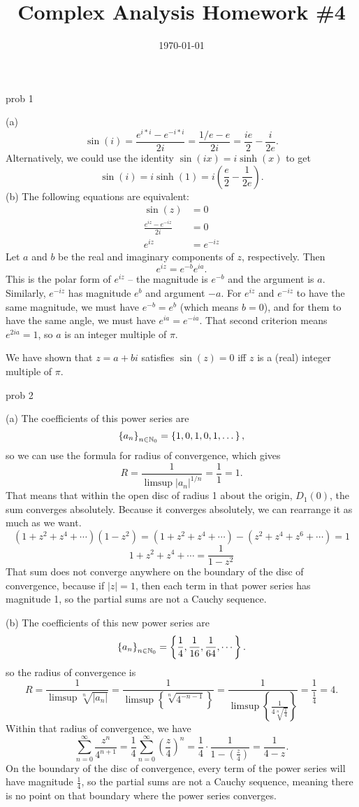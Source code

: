 \documentclass{article}
\date{\today}
\title{Complex Analysis Homework \#4}
\begin{document}
\maketitle

\begin{prob}
    prob 1
\end{prob}
(a)
\[ \sin(i) = \frac{e^{i*i}-e^{-i*i}}{2i} = \frac{1/e-e}{2i} = \frac{ie}{2}- \frac{i}{2e}. \]
Alternatively, we could use the identity $\sin(ix)=i \sinh(x)$ to get
\[ \sin(i) = i \sinh(1) = i \left( \frac{e}{2} - \frac{1}{2e} \right).  \]
(b) The following equations are equivalent:
\begin{align*}
    \sin(z) &= 0 \\
    \frac{e^{iz}-e^{-iz}}{2i} &= 0 \\
    e^{iz} &= e^{-iz}
\end{align*}
Let $a$ and $b$ be the real and imaginary components of $z$, respectively. Then
\[ e^{iz}=e^{-b}e^{ia}. \]
This is the polar form of $e^{iz}$ -- the magnitude is $e^{-b}$ and the argument is $a$. Similarly, $e^{-iz}$ has magnitude $e^b$ and argument $-a$. For $e^{iz}$ and $e^{-iz}$ to have the same magnitude, we must have $e^{-b}=e^b$ (which means $b=0$), and for them to have the same angle, we must have $e^{ia}=e^{-ia}$. That second criterion means $e^{2ia}=1$, so $a$ is an integer multiple of $\pi$.
\par
We have shown that $z=a+bi$ satisfies $\sin(z)=0$ iff $z$ is a (real) integer multiple of $\pi$.

\begin{prob}
    prob 2
\end{prob}
(a) The coefficients of this power series are
\[ \left\{ a_n \right\}_{n \in \mathbb{N}_0} = \left\{ 1,0,1,0,1,\dots \right\}, \]
so we can use the formula for radius of convergence, which gives
\[ R = \frac{1}{\limsup |a_n|^{1/n}} = \frac{1}{1} = 1. \]
That means that within the open disc of radius 1 about the origin, $D_1(0)$, the sum converges absolutely. Because it converges absolutely, we can rearrange it as much as we want.
\[ (1+z^2+z^4+\cdots)(1-z^2)=(1+z^2+z^4+\cdots)-(z^2+z^4+z^6+\cdots)=1 \]
\[ 1+z^2+z^4+\cdots= \frac{1}{1-z^2} \]
That sum does not converge anywhere on the boundary of the disc of convergence, because if $|z|=1$, then each term in that power series has magnitude 1, so the partial sums are not a Cauchy sequence.
\bigskip
\par
(b) The coefficients of this new power series are
\[ \left\{ a_n \right\}_{n \in \mathbb{N}_0} = \left\{ \frac{1}{4}, \frac{1}{16}, \frac{1}{64}, \cdots \right\}. \]
so the radius of convergence is
\[ R = \frac{1}{\limsup \sqrt[n]{|a_n|}} = \frac{1}{\limsup \left\{ \sqrt[n]{4^{-n-1} } \right\}} = \frac{1}{\limsup \left\{ \frac{1}{4\sqrt[n]{ \frac{1}{4}}}  \right\} } = \frac{1}{ \frac{1}{4}} = 4.\]
Within that radius of convergence, we have
\[ \sum_{n=0}^\infty \frac{z^n}{4^{n+1}} = \frac{1}{4} \sum_{n=0}^\infty \left( \frac{z}{4} \right)^n = \frac{1}{4} \cdot \frac{1}{1- \left( \frac{z}{4} \right) }  = \frac{1}{4-z}. \]
On the boundary of the disc of convergence, every term of the power series will have magnitude $ \frac{1}{4}$, so the partial sums are not a Cauchy sequence, meaning there is no point on that boundary where the power series converges.
\end{document}
